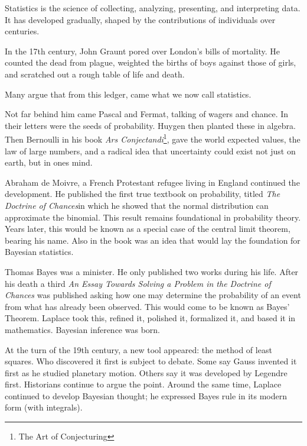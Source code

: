 Statistics is the science of collecting, analyzing, presenting, and interpreting data.  
It has developed gradually, shaped by the contributions of individuals over centuries.

In the 17th century, John Graunt pored over London's bills of mortality.  
He counted the dead from plague, weighted the births of boys against those of girls, and scratched out a rough table of life and death\cite{glass_john_1964}.

Many argue that from this ledger, came what we now call statistics.

Not far behind him came Pascal and Fermat, talking of wagers and chance.  
In their letters were the seeds of probability\cite{fienberg_review_1992}.  
Huygen then planted these in algebra.  
Then Bernoulli in his book \emph{Ars Conjectandi}\footnote{The Art of Conjecturing}, gave the world expected values, the law of large numbers, and a radical idea that uncertainty could exist not just on earth, but in ones mind. 

Abraham de Moivre, a French Protestant refugee living in England continued the development.  
He published the first true textbook on probability, titled \emph{The Doctrine of Chances}in which he showed that the normal distribution can approximate the binomial\cite{fienberg_review_1992}.    
This result remains foundational in probability theory.  
Years later, this would be known as a special case of the central limit theorem, bearing his name.  
Also in the book was an idea that would lay the foundation for Bayesian statistics.  

Thomas Bayes was a minister.  He only published two works during his life.  
After his death a third \emph{An Essay Towards Solving a Problem in the Doctrine of Chances} was published asking how one may determine the probability of an event from what has already been observed.  
This would come to be known as Bayes' Theorem.  
Laplace took this, refined it, polished it, formalized it, and based it in mathematics.  Bayesian inference was born.  

At the turn of the 19th century, a new tool appeared: the method of least squares.  
Who discovered it first is subject to debate.  
Some say Gauss invented it first as he studied planetary motion.  
Others say it was developed by Legendre first.  
Historians continue to argue the point\cite{plackett_studies_1972}\cite{stigler_history_1986}.
Around the same time, Laplace continued to develop Bayesian thought; he expressed Bayes rule in its modern form (with integrals).

